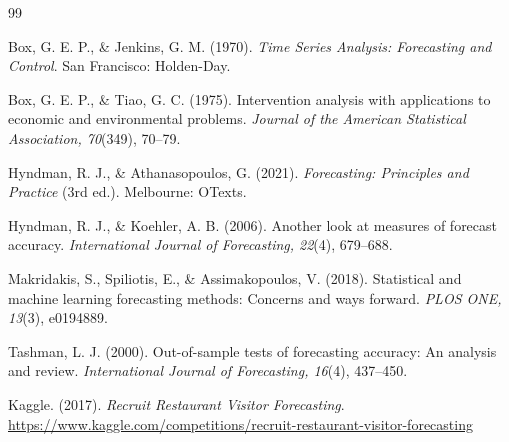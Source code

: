 \documentclass[11pt,oneside]{scrartcl}
\begin{document}
\begin{thebibliography}{99}

Box, G. E. P., \& Jenkins, G. M. (1970).
\textit{Time Series Analysis: Forecasting and Control}.
San Francisco: Holden-Day.

Box, G. E. P., \& Tiao, G. C. (1975).
Intervention analysis with applications to economic and environmental problems.
\textit{Journal of the American Statistical Association, 70}(349), 70--79.

Hyndman, R. J., \& Athanasopoulos, G. (2021).
\textit{Forecasting: Principles and Practice} (3rd ed.).
Melbourne: OTexts.

Hyndman, R. J., \& Koehler, A. B. (2006).
Another look at measures of forecast accuracy.
\textit{International Journal of Forecasting, 22}(4), 679--688.

Makridakis, S., Spiliotis, E., \& Assimakopoulos, V. (2018).
Statistical and machine learning forecasting methods: Concerns and ways forward.
\textit{PLOS ONE, 13}(3), e0194889.

Tashman, L. J. (2000).
Out-of-sample tests of forecasting accuracy: An analysis and review.
\textit{International Journal of Forecasting, 16}(4), 437--450.

Kaggle. (2017).
\textit{Recruit Restaurant Visitor Forecasting}.
\url{https://www.kaggle.com/competitions/recruit-restaurant-visitor-forecasting}

\end{thebibliography}
\end{document}
